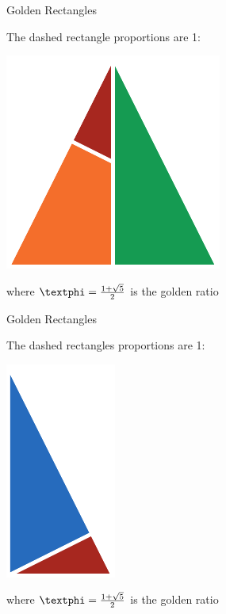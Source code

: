 \documentclass[14pt]{beamer}
\begin{document}

    \begin{frame}{Golden Rectangles}
        \begin{center}
            The dashed rectangle proportions are 1:\textphi
        \end{center}
        \hspace{4.1em} \includegraphics[scale=1.0]{figures/figure020f.pdf} \\
        \begin{center}
            where $\text{\textphi} =\tfrac{1+\sqrt{5}}{2}$ is the golden ratio
        \end{center}
    \end{frame}


    \begin{frame}{Golden Rectangles}
        \begin{center}
            The dashed rectangles proportions are 1:\textphi
        \end{center}
        \hspace{3.85em} \includegraphics[scale=1.0]{figures/figure020c.pdf} \\
        \begin{center}
            where $\text{\textphi} =\tfrac{1+\sqrt{5}}{2}$ is the golden ratio
        \end{center}
    \end{frame}
\end{document}
